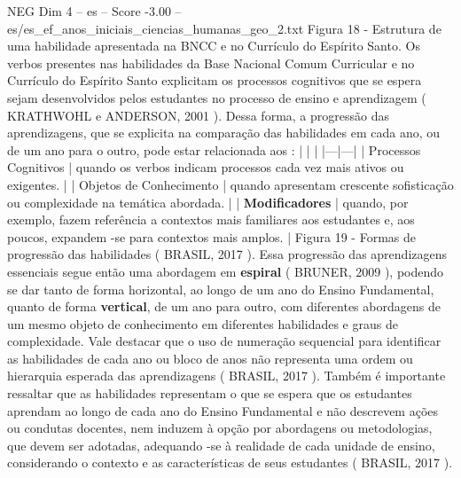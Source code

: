 \begin{textsample}{NEG Dim 4 – es – Score -3.00 – es/es\_ef\_anos\_iniciais\_ciencias\_humanas\_geo\_2.txt}
Figura 18 - Estrutura de uma habilidade apresentada na BNCC e no Currículo do Espírito Santo.
Os verbos presentes nas habilidades da Base Nacional Comum Curricular e no Currículo do Espírito Santo explicitam os processos cognitivos que se espera sejam desenvolvidos pelos estudantes no processo de ensino e aprendizagem ( KRATHWOHL e ANDERSON, 2001 ).
Dessa forma, a progressão das aprendizagens, que se explicita na comparação das habilidades em cada ano, ou de um ano para o outro, pode estar relacionada aos : | | | |---|---| | Processos Cognitivos | quando os verbos indicam processos cada vez mais ativos ou exigentes. | | Objetos de Conhecimento | quando apresentam crescente sofisticação ou complexidade na temática abordada. | | \textbf{Modificadores} | quando, por exemplo, fazem referência a contextos mais familiares aos estudantes e, aos poucos, expandem -se para contextos mais amplos. | Figura 19 - Formas de progressão das habilidades ( BRASIL, 2017 ).
Essa progressão das aprendizagens essenciais segue então uma abordagem em \textbf{espiral} ( BRUNER, 2009 ), podendo se dar tanto de forma horizontal, ao longo de um ano do Ensino Fundamental, quanto de forma \textbf{vertical}, de um ano para outro, com diferentes abordagens de um mesmo objeto de conhecimento em diferentes habilidades e graus de complexidade.
Vale destacar que o uso de numeração sequencial para identificar as habilidades de cada ano ou bloco de anos não representa uma ordem ou hierarquia esperada das aprendizagens ( BRASIL, 2017 ).
Também é importante ressaltar que as habilidades representam o que se espera que os estudantes aprendam ao longo de cada ano do Ensino Fundamental e não descrevem ações ou condutas docentes, nem induzem à opção por abordagens ou metodologias, que devem ser adotadas, adequando -se à realidade de cada unidade de ensino, considerando o contexto e as características de seus estudantes ( BRASIL, 2017 ).

\end{textsample}

